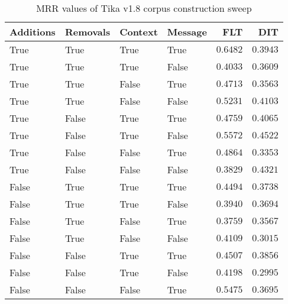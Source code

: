 
\begin{table}
\begin{spacing}{1.2}
\centering
\caption{MRR values of Tika v1.8 corpus construction sweep}
\label{table:tika_corpus_sweep}
\vspace{0.2em}
\begin{tabular}{llll|rr}
\toprule
Additions & Removals & Context & Message & FLT &        DIT \\
\midrule
     True &     True &    True &    True &    $\bm{0.6482}$ &      $0.3943$ \\
     \myrowcolor True &     True &    True &   False &         $0.4033$ &      $0.3609$ \\
     True &     True &   False &    True &         $0.4713$ &      $0.3563$ \\
     True &     True &   False &   False &         $0.5231$ &      $0.4103$ \\
     True &    False &    True &    True &         $0.4759$ &      $0.4065$ \\
     True &    False &    True &   False &         $0.5572$ & $\bm{0.4522}$ \\
     True &    False &   False &    True &         $0.4864$ &      $0.3353$ \\
     True &    False &   False &   False &         $0.3829$ &      $0.4321$ \\
    False &     True &    True &    True &         $0.4494$ &      $0.3738$ \\
    False &     True &    True &   False &         $0.3940$ &      $0.3694$ \\
    False &     True &   False &    True &         $0.3759$ &      $0.3567$ \\
    False &     True &   False &   False &         $0.4109$ &      $0.3015$ \\
    False &    False &    True &    True &         $0.4507$ &      $0.3856$ \\
    False &    False &    True &   False &         $0.4198$ &      $0.2995$ \\
    False &    False &   False &    True &         $0.5475$ &      $0.3695$ \\
\bottomrule
\end{tabular}

\end{spacing}
\end{table}

